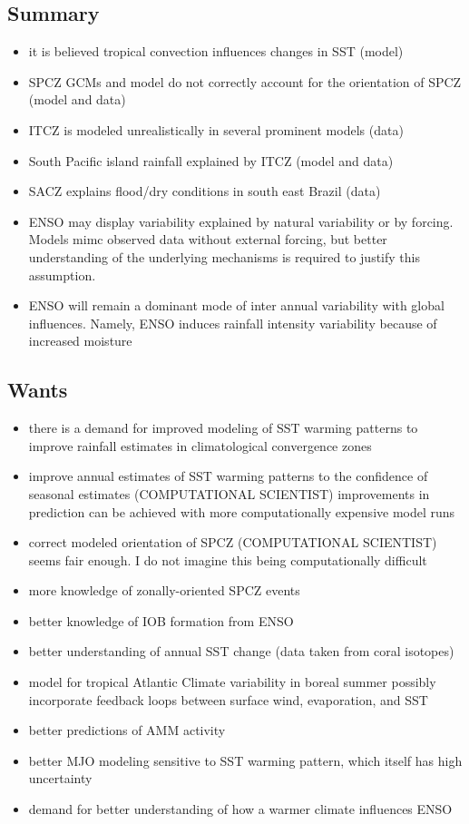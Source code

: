 \subsection{Summary}
\begin{itemize}
	\item it is believed tropical convection influences changes in SST (model)
	\item SPCZ GCMs and model do not correctly account for the orientation of SPCZ (model and data)
	\item ITCZ is modeled unrealistically in several prominent models (data)
	\item South Pacific island rainfall explained by ITCZ (model and data)
	\item SACZ explains flood/dry conditions  in south east Brazil (data) 
	\item ENSO may display variability explained by natural variability or by forcing. Models mimc observed data without external forcing, but better understanding of the underlying mechanisms is required to justify this assumption. 
	\item ENSO will remain a dominant mode of inter annual variability with global influences. Namely, ENSO induces rainfall intensity variability because of increased moisture 
\end{itemize}

\subsection{Wants}
\begin{itemize}
	\item there is a demand for improved modeling of SST warming patterns to improve rainfall estimates in climatological convergence zones
	\item improve annual estimates of SST warming patterns to the confidence of seasonal estimates
		\subitem{-} (COMPUTATIONAL SCIENTIST) improvements in prediction can be achieved with more computationally expensive model runs
	\item correct modeled orientation of SPCZ
		\subitem{-} (COMPUTATIONAL SCIENTIST) seems fair enough. I do not imagine this being computationally difficult
	\item more knowledge of zonally-oriented SPCZ events
	\item better knowledge of IOB formation from ENSO
	\item better understanding of annual SST change (data taken from coral isotopes)
	\item model for tropical Atlantic Climate variability in boreal summer
		\subitem{-} possibly incorporate feedback loops between surface wind, evaporation, and SST
	\item better predictions of AMM activity
	\item better MJO modeling 
		\subitem{-} sensitive to SST warming pattern, which itself has high uncertainty 
	\item demand for better understanding of how a warmer climate influences ENSO

\end{itemize}
